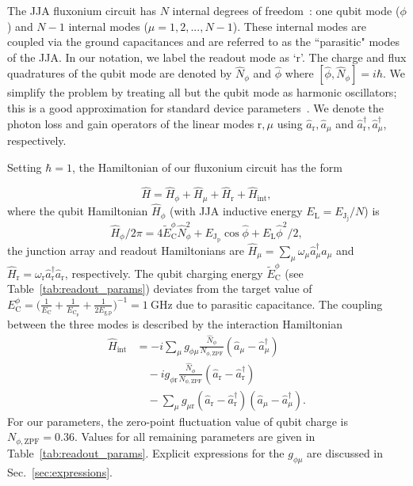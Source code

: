 \documentclass[%
reprint,
superscriptaddress,
 amsmath,amssymb,
 aps,
 prx,
longbibliography,
floatfix,
]{revtex4-2}
\begin{document}
The JJA fluxonium circuit has $N$ internal degrees of freedom~\cite{ferguson2013symmetries}: one qubit mode ($\phi$) and $N-1$ internal modes ($\mu=1,2,...,N-1$). These internal modes are coupled via the ground capacitances and are referred to as the ``parasitic" modes of the JJA. 
In our notation, we label the readout mode as `$\mathrm{r}$'. The charge and flux quadratures of the qubit mode are denoted by $\hat N_\phi$ and $\hat \phi$ where $[\hat \phi,\hat N_\phi]=i\hbar$. 
We simplify the problem by treating all but the qubit mode as harmonic oscillators; this is a good approximation for standard device parameters~\cite{ferguson2013symmetries,viola2015collective,dumas2024unified}. We denote the photon loss and gain operators of the linear modes $\mathrm{r},\mu$ using $\hat a_\textrm{r},\hat a_\mu$ and $\hat a_\textrm{r}^\dagger,\hat a_\mu^\dagger$, respectively. 

Setting $\hbar=1$, the Hamiltonian of our fluxonium circuit has the form

\begin{equation}
   \hat H =\hat{H}_\phi + \hat{H}_\mu + \hat{H}_\textrm{r} + \hat{H}_{\textrm{int}},\label{Hamiltonian_total}
\end{equation}
where the qubit Hamiltonian $\hat{H}_\phi$ (with JJA inductive energy $E_\textrm{L}=E_{\textrm{J}_\textrm{j}}/N$) is 
\begin{equation}
\hat{H}_\phi / 2\pi = 4\tilde{E}^\phi_\textrm{C} \hat N_\phi^2+ E_{\textrm{J}_\textrm{p}}\cos{\hat\phi}+E_\textrm{L}\hat \phi^2 /2,\label{eq:Hphi}
\end{equation}
the junction array and readout Hamiltonians are $\hat{H}_\mu = \sum_{\mu}\omega_\mu \hat a_\mu^\dagger \hat a_\mu$ and $\hat{H}_\textrm{r} = \omega_\textrm{r} \hat a_\textrm{r}^\dagger \hat a_\textrm{r}$, respectively. The qubit charging energy
$\tilde{E}^\phi_\textrm{C}$ (see Table~\ref{tab:readout_params}) deviates from the target value of $E_\textrm{C}^{\phi}=\big(\frac{1}{E_\textrm{C}}+\frac{1}{E_{\textrm{C}_\textrm{p}}}+\frac{1}{2E_\textrm{g,p}}\big)^{-1}=1 \ \mathrm{GHz}$ due to parasitic capacitance. The coupling between the three modes is described by the interaction Hamiltonian
\begin{align}\label{eq:int_hamiltonian}
\hat{H}_{\textrm{int}} &= -i\sum_{\mu} g_{\phi\mu} \frac{\hat N_\phi}{{N_{\phi,\mathrm{ZPF}}}} (\hat a_\mu-\hat a_\mu^\dagger)\nonumber \\ &\quad-ig_{\phi \textrm{r}} \frac{\hat N_\phi}{{N_{\phi,\mathrm{ZPF}}}} (\hat a_\textrm{r}-\hat a_\textrm{r}^\dagger) \nonumber \\&\quad- \sum_{\mu} g_{\mu \textrm{r}} (\hat a_\textrm{r}-\hat a_\textrm{r}^\dagger)(\hat a_\mu-\hat a_\mu^\dagger).
\end{align}
For our parameters, the zero-point fluctuation value of qubit charge is $N_{\phi,\mathrm{ZPF}}=0.36$. Values for all remaining parameters are given in Table~\ref{tab:readout_params}. Explicit expressions for the $g_{\phi\mu}$ are discussed in Sec.~\ref{sec:expressions}.
 
\end{document}
